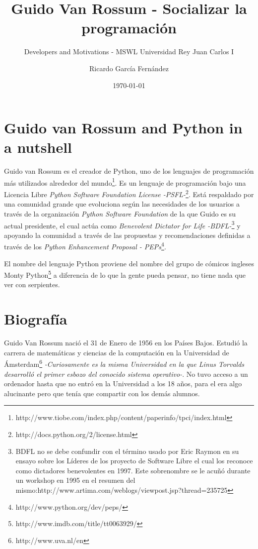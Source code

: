 \documentclass[11pt]{scrartcl}
\title{\textbf{Guido Van Rossum - Socializar la programación}}
\subtitle{Developers and Motivations - MSWL Universidad Rey Juan Carlos I}
\author{Ricardo García Fernández}
\date{\today}
\begin{document}
\maketitle

\newpage

\tableofcontents

\newpage

\section{Guido van Rossum and Python in a nutshell}\label{sec:nutshell}

Guido van Rossum es el creador de Python, uno de los lenguajes de programación más utilizados alrededor del mundo\footnote{http://www.tiobe.com/index.php/content/paperinfo/tpci/index.html}. Es un lenguaje de programación bajo una Licencia Libre \emph{Python Software Foundation License -PSFL-}\footnote{http://docs.python.org/2/license.html}. Está respaldado por una comunidad grande que evoluciona según las necesidades de los usuarios a través de la organización \emph{Python Software Foundation} de la que Guido es su actual presidente, el cual actúa como \emph{Benevolent Dictator for Life -BDFL-}\footnote{BDFL no se debe confundir con el término usado por Eric Raymon en su ensayo sobre los Líderes de los proyecto de Software Libre el cual los reconoce como dictadores benevolentes en 1997. Este sobrenombre se le acuñó durante un workshop en 1995 en el resumen del mismo:http://www.artima.com/weblogs/viewpost.jsp?thread=235725} y apoyando la comunidad a través de las propuestas y recomendaciones definidas a través de los \emph{Python Enhancement Proposal - PEPs}\footnote{http://www.python.org/dev/peps/}.

El nombre del lenguaje Python proviene del nombre del grupo de cómicos ingleses Monty Python\footnote{http://www.imdb.com/title/tt0063929/} a diferencia de lo que la gente pueda pensar, no tiene nada que ver con serpientes.

\section{Biografía}\label{sec:bigraphy}

Guido Van Rossum nació el 31 de Enero de 1956 en los Países Bajos. Estudió la carrera de matemáticas y ciencias de la computación en la Universidad de Ámsterdam\footnote{http://www.uva.nl/en} \emph{-Curiosamente es la misma Universidad en la que Linus Torvalds desarrolló el primer esbozo del conocido sistema operativo-}.
No tuvo acceso a un ordenador hasta que no entró en la Universidad a los 18 años, para el era algo alucinante pero que tenía que compartir con los demás alumnos.
\end{document}
